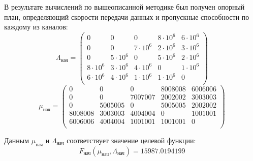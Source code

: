 \documentclass[14pt,a4paper,titlepage]{extarticle}
\begin{document}
В результате вычислений по вышеописанной методике был получен опорный план, определяющий скорости передачи данных и пропускные способности по каждому из каналов:
\begin{equation}
\Lambda_{\text{нач}} = 
\begin{pmatrix}
0 & 0 & 0 & 8 \cdot 10^{6} & 6 \cdot 10^{6} \\
0 & 0 & 7 \cdot 10^{6} & 2 \cdot 10^{6} & 3 \cdot 10^{6} \\
0 & 5 \cdot 10^{6} & 0 & 5 \cdot 10^{6} & 2 \cdot 10^{6} \\
8 \cdot 10^{6} & 3 \cdot 10^{6} & 4 \cdot 10^{6} & 0 & 1 \cdot 10^{6} \\
6 \cdot 10^{6} & 4 \cdot 10^{6} & 1 \cdot 10^{6} & 1 \cdot 10^{6} & 0 \\
\end{pmatrix}
\end{equation}
\begin{equation}
\mu_{\text{нач}} = 
\begin{pmatrix}
0 & 0 & 0 & 8008008 & 6006006 \\
0 & 0 & 7007007 & 2002002 & 3003003 \\
0 & 5005005 & 0 & 5005005 & 2002002 \\
8008008 & 3003003 & 4004004 & 0 & 1001001 \\
6006006 & 4004004 & 1001001 & 1001001 & 0 \\
\end{pmatrix}
\end{equation}

Данным $\mu_{\text{нач}}$ и $\Lambda_{\text{нач}}$ соответствует значение целевой функции:
\begin{equation}
F_{\text{нач}}(\mu_{\text{нач}}, \Lambda_{\text{нач}}) = 15987.0194199
\end{equation}
\end{document}
